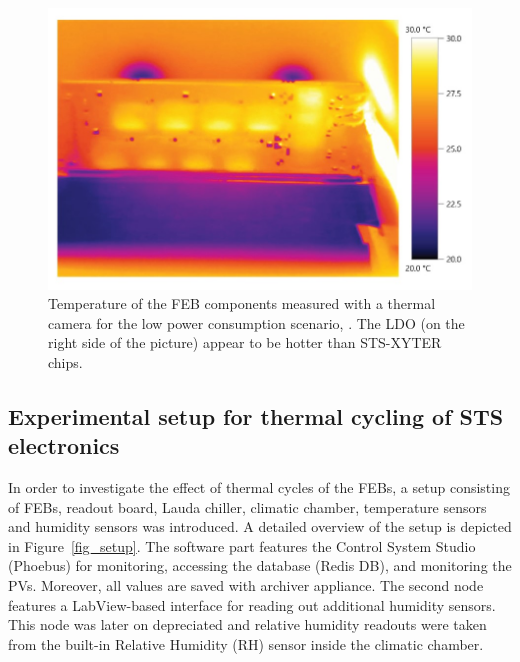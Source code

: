 \begin{figure}[!h]
\centering
\includegraphics[width=0.6\columnwidth]{Chapter4/images/feb_thermal.jpg}
\caption{Temperature of the \gls{FEB} components measured with a thermal camera for the low power consumption scenario, \cite{leo_electronics}. The \gls{LDO} (on the right side of the picture) appear to be hotter than STS-XYTER chips.}
\label{fig_temperatures_camera}
\end{figure}




\subsection{Experimental setup for thermal cycling of STS electronics}
\label{cycling_setup}
In order to investigate the effect of thermal cycles of the FEBs, a setup consisting of FEBs, readout board, Lauda chiller, climatic chamber, temperature sensors and humidity sensors was introduced.
A detailed overview of the setup is depicted in Figure~\ref{fig_setup}. The software part features the Control System Studio (Phoebus) for monitoring, accessing the database (Redis DB), and monitoring the \gls{PV}s. Moreover, all values are saved with archiver appliance. The second node features a LabView-based interface for reading out additional humidity sensors. This node was later on depreciated and relative humidity readouts were taken from the built-in Relative Humidity (\gls{RH}) sensor inside the climatic chamber.

